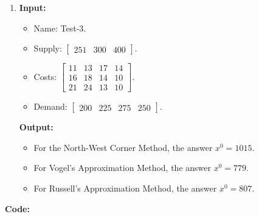 \documentclass{article}
\begin{document}
\begin{enumerate}[label={(\arabic*)}, itemsep=0.25in]
    \item \textbf{Input:}
          \begin{itemize}
              \item Name: Test-3.
              \item Supply: \(\begin{bmatrix} 251 & 300 & 400 \end{bmatrix}\).
              \item Costs: \(\begin{bmatrix}
                        11 & 13 & 17 & 14 \\
                        16 & 18 & 14 & 10 \\
                        21 & 24 & 13 & 10
                    \end{bmatrix}\).
              \item Demand: \(\begin{bmatrix} 200 & 225 & 275 & 250 \end{bmatrix}\).
          \end{itemize}
          \textbf{Output:}
          \begin{itemize}
              \item For the North-West Corner Method, the answer \(x^0 = \num{1015}\).
              \item For Vogel's Approximation Method, the answer \(x^0 = \num{779}\).
              \item For Russell's Approximation Method, the answer \(x^0 = \num{807}\).
          \end{itemize}
\end{enumerate}

\newpage

\textbf{Code:}


\newpage


\newpage


\newpage


\newpage

\end{document}
